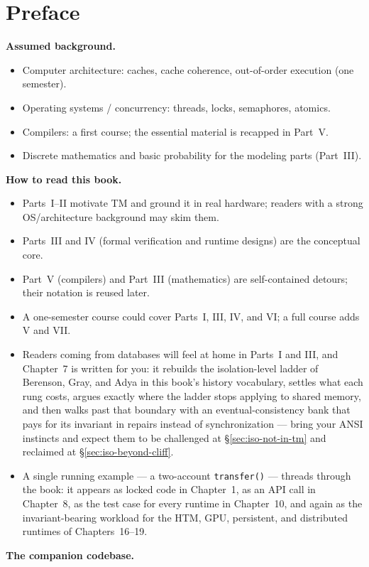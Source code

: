 \chapter*{Preface}
\textbf{Assumed background.}
\begin{itemize}
    \item Computer architecture: caches, cache coherence, out-of-order execution (one semester).
    \item Operating systems / concurrency: threads, locks, semaphores, atomics.
    \item Compilers: a first course; the essential material is recapped in Part~V.
    \item Discrete mathematics and basic probability for the modeling parts (Part~III).
\end{itemize}
\textbf{How to read this book.}
\begin{itemize}
    \item Parts~I--II motivate TM and ground it in real hardware; readers with a strong OS/architecture background may skim them.
    \item Parts~III and IV (formal verification and runtime designs) are the conceptual core.
    \item Part~V (compilers) and Part~III (mathematics) are self-contained detours; their notation is reused later.
    \item A one-semester course could cover Parts~I, III, IV, and VI; a full course adds V and VII.
    \item Readers coming from databases will feel at home in Parts~I and III, and Chapter~7 is written for you: it rebuilds the isolation-level ladder of Berenson, Gray, and Adya in this book's history vocabulary, settles what each rung costs, argues exactly where the ladder stops applying to shared memory, and then walks past that boundary with an eventual-consistency bank that pays for its invariant in repairs instead of synchronization --- bring your ANSI instincts and expect them to be challenged at \S\ref{sec:iso-not-in-tm} and reclaimed at \S\ref{sec:iso-beyond-cliff}.
    \item A single running example --- a two-account \texttt{transfer()} --- threads through the book: it appears as locked code in Chapter~1, as an API call in Chapter~8, as the test case for every runtime in Chapter~10, and again as the invariant-bearing workload for the HTM, GPU, persistent, and distributed runtimes of Chapters~16--19.
\end{itemize}
\textbf{The companion codebase.}
